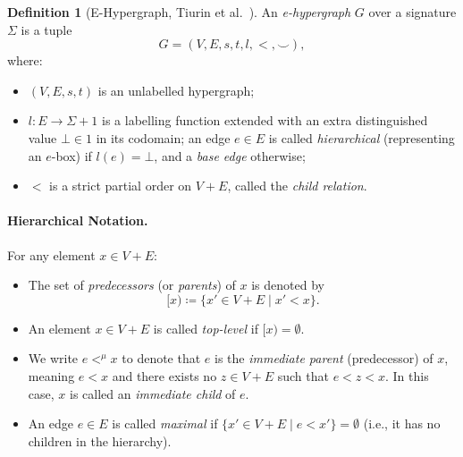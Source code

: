 \documentclass[11pt,a4paper]{article}
\theoremstyle{definition}
\newtheorem{definition}{Definition}[section]
\theoremstyle{plain}
\begin{document}
\begin{definition}[E-Hypergraph, Tiurin et al.~\cite{tiurin2024equivalence}]
\label{def:e-hypergraph}
An \emph{e-hypergraph} $G$ over a signature $\Sigma$ is a tuple
\[
G = (V, E, s, t, l, <, \smile),
\]
where:
\begin{itemize}
    \item $(V, E, s, t)$ is an unlabelled hypergraph;
    \item $l \colon E \to \Sigma + 1$ is a labelling function extended with an extra distinguished value $\bot \in 1$ in its codomain; an edge $e \in E$ is called \emph{hierarchical} (representing an $e$-box) if $l(e) = \bot$, and a \emph{base edge} otherwise;
    \item $<$ is a strict partial order on $V + E$, called the \emph{child relation}.
\end{itemize}

\paragraph{Hierarchical Notation.}
For any element $x \in V + E$:
\begin{itemize}
    \item The set of \emph{predecessors} (or \emph{parents}) of $x$ is denoted by
    \[
    [x) \coloneqq \{ x' \in V + E \mid x' < x \}.
    \]
    \item An element $x \in V + E$ is called \emph{top-level} if $[x) = \emptyset$.
    \item We write $e <^\mu x$ to denote that $e$ is the \emph{immediate parent} (predecessor) of $x$, meaning $e < x$ and there exists no $z \in V + E$ such that $e < z < x$. In this case, $x$ is called an \emph{immediate child} of $e$.
    \item An edge $e \in E$ is called \emph{maximal} if $\{ x' \in V + E \mid e < x' \} = \emptyset$ (i.e., it has no children in the hierarchy).
\end{itemize}


\end{definition}
\end{document}
